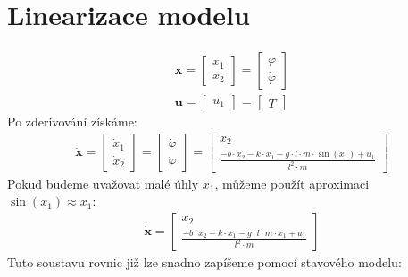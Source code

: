 \section{Linearizace modelu}
\begin{align}
    \bm{x} =
    \begin{bmatrix}
        x_1 \\
        x_2
    \end{bmatrix}
    = \begin{bmatrix}
          \varphi \\
          \dot{\varphi}
      \end{bmatrix}
    \\
    \bm{u} =
    \begin{bmatrix}
        u_1
    \end{bmatrix}
    = \begin{bmatrix}
          T
      \end{bmatrix}
\end{align}
Po zderivování získáme:
\begin{align}
    \bm{\dot{x}} =
    \begin{bmatrix}
        \dot{x}_1 \\
        \dot{x}_2
    \end{bmatrix}
    = \begin{bmatrix}
          \dot{\varphi} \\
          \ddot{\varphi}
      \end{bmatrix}
    =\begin{bmatrix}
         x_2 \\
         \frac{-b\cdot x_2
             - k\cdot x_1
             - g\cdot l \cdot m \cdot\sin(x_1) + u_1
         }{l^2\cdot m}
     \end{bmatrix}
\end{align}
Pokud budeme uvažovat malé úhly $x_1$, můžeme použít aproximaci $\sin(x_1) \approx x_1$:
\begin{align}
    \bm{\dot{x}} =\begin{bmatrix}
                      x_2 \\
                      \frac{-b\cdot x_2
                          - k\cdot x_1
                          - g\cdot l \cdot m \cdot x_1 + u_1
                      }{l^2\cdot m}
                  \end{bmatrix}
\end{align}
Tuto soustavu rovnic již lze snadno zapíšeme pomocí stavového modelu:
